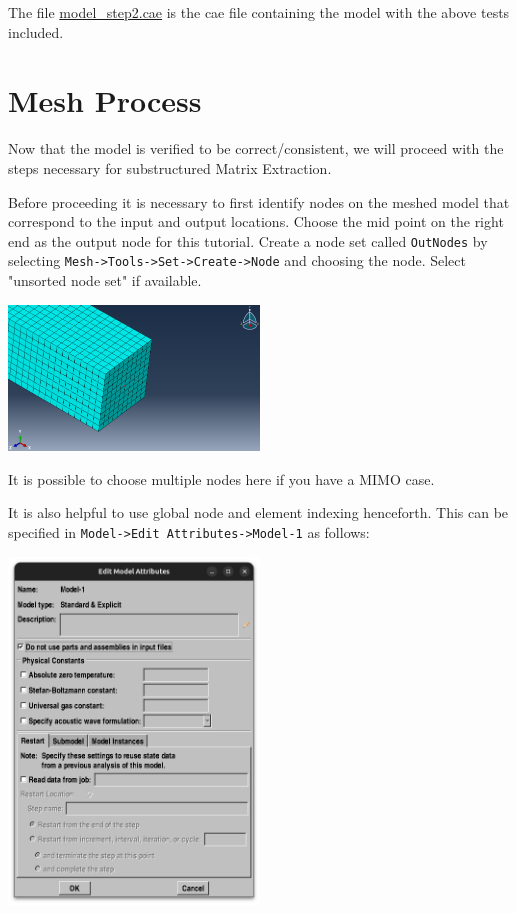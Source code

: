 \documentclass[11pt]{article}
\begin{document}
The file \href{https://github.com/Nidish96/Abaqus4Joints/blob/main/assets/assembly/model\_step2.cae}{model\_step2.cae} is the cae file containing the model with the above tests included.
\section{Mesh Process}
\label{sec:meshproc}
Now that the model is verified to be correct/consistent, we will proceed with the steps necessary for substructured Matrix Extraction.

Before proceeding it is necessary to first identify nodes on the meshed model that correspond to the input and output locations.
Choose the mid point on the right end as the output node for this tutorial.
Create a node set called \texttt{OutNodes} by selecting \texttt{Mesh->Tools->Set->Create->Node} and choosing the node. Select "unsorted node set" if available.
\begin{center}
\includegraphics[width=0.5\textwidth]{./figs/outnode.png}
\end{center}
It is possible to choose multiple nodes here if you have a MIMO case.

It is also helpful to use global node and element indexing henceforth.
This can be specified in \texttt{Model->Edit Attributes->Model-1} as follows:
\begin{center}
\includegraphics[width=0.5\textwidth]{./figs/modl.png}
\end{center}
\end{document}
